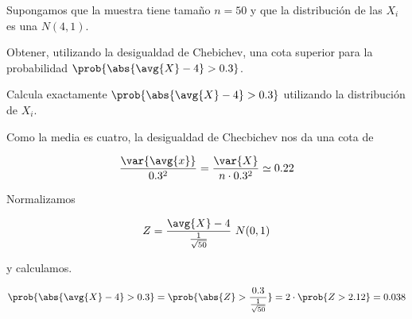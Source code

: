 \begin{problem}[2] Supongamos que la muestra tiene tamaño $n=50$ y que la distribución de las $X_i$ es una $N(4,1)$. 

\ppart Obtener, utilizando la desigualdad de Chebichev, una cota superior para la probabilidad $\prob{\abs{\avg{X} - 4} > 0.3}$.

\ppart Calcula exactamente $\prob{\abs{\avg{X} - 4} > 0.3}$ utilizando la distribución de $X_i$. 

\solution
\spart

Como la media es cuatro, la desigualdad de Checbichev nos da una cota de 

\[ \frac{\var{\avg{x}}}{0.3^2} = \frac{\var{X}}{n \cdot 0.3^2} \simeq 0.22 \]

\spart

Normalizamos

\[ Z = \frac{\avg{X} - 4}{\frac{1}{\sqrt{50}}} ~ N(0,1) \]

y calculamos.

\[ \prob{\abs{\avg{X} - 4} > 0.3} = \prob{\abs{Z} > \frac{0.3}{\frac{1}{\sqrt{50}}}} = 2 \cdot \prob{Z > 2.12} = 0.038 \]

\end{problem}

